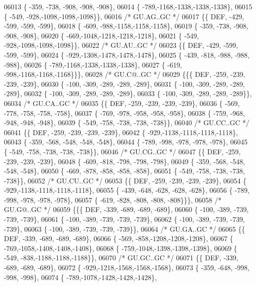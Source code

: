 \begin{DoxyCode}
06013 \{ -359, -738, -908, -908, -908\},
06014 \{ -789,-1168,-1338,-1338,-1338\},
06015 \{ -549, -928,-1098,-1098,-1098\}\},
06016 \textcolor{comment}{/* GU.AG..GC */}
06017 \{\{  DEF, -429, -599, -599, -599\},
06018 \{ -609, -988,-1158,-1158,-1158\},
06019 \{ -359, -738, -908, -908, -908\},
06020 \{ -669,-1048,-1218,-1218,-1218\},
06021 \{ -549, -928,-1098,-1098,-1098\}\},
06022 \textcolor{comment}{/* GU.AU..GC */}
06023 \{\{  DEF, -429, -599, -599, -599\},
06024 \{ -929,-1308,-1478,-1478,-1478\},
06025 \{ -439, -818, -988, -988, -988\},
06026 \{ -789,-1168,-1338,-1338,-1338\},
06027 \{ -619, -998,-1168,-1168,-1168\}\}\},
06028 \textcolor{comment}{/* GU.C@..GC */}
06029 \{\{\{  DEF, -259, -239, -239, -239\},
06030 \{ -100, -309, -289, -289, -289\},
06031 \{ -100, -309, -289, -289, -289\},
06032 \{ -100, -309, -289, -289, -289\},
06033 \{ -100, -309, -289, -289, -289\}\},
06034 \textcolor{comment}{/* GU.CA..GC */}
06035 \{\{  DEF, -259, -239, -239, -239\},
06036 \{ -569, -778, -758, -758, -758\},
06037 \{ -769, -978, -958, -958, -958\},
06038 \{ -759, -968, -948, -948, -948\},
06039 \{ -549, -758, -738, -738, -738\}\},
06040 \textcolor{comment}{/* GU.CC..GC */}
06041 \{\{  DEF, -259, -239, -239, -239\},
06042 \{ -929,-1138,-1118,-1118,-1118\},
06043 \{ -359, -568, -548, -548, -548\},
06044 \{ -789, -998, -978, -978, -978\},
06045 \{ -549, -758, -738, -738, -738\}\},
06046 \textcolor{comment}{/* GU.CG..GC */}
06047 \{\{  DEF, -259, -239, -239, -239\},
06048 \{ -609, -818, -798, -798, -798\},
06049 \{ -359, -568, -548, -548, -548\},
06050 \{ -669, -878, -858, -858, -858\},
06051 \{ -549, -758, -738, -738, -738\}\},
06052 \textcolor{comment}{/* GU.CU..GC */}
06053 \{\{  DEF, -259, -239, -239, -239\},
06054 \{ -929,-1138,-1118,-1118,-1118\},
06055 \{ -439, -648, -628, -628, -628\},
06056 \{ -789, -998, -978, -978, -978\},
06057 \{ -619, -828, -808, -808, -808\}\}\},
06058 \textcolor{comment}{/* GU.G@..GC */}
06059 \{\{\{  DEF, -339, -689, -689, -689\},
06060 \{ -100, -389, -739, -739, -739\},
06061 \{ -100, -389, -739, -739, -739\},
06062 \{ -100, -389, -739, -739, -739\},
06063 \{ -100, -389, -739, -739, -739\}\},
06064 \textcolor{comment}{/* GU.GA..GC */}
06065 \{\{  DEF, -339, -689, -689, -689\},
06066 \{ -569, -858,-1208,-1208,-1208\},
06067 \{ -769,-1058,-1408,-1408,-1408\},
06068 \{ -759,-1048,-1398,-1398,-1398\},
06069 \{ -549, -838,-1188,-1188,-1188\}\},
06070 \textcolor{comment}{/* GU.GC..GC */}
06071 \{\{  DEF, -339, -689, -689, -689\},
06072 \{ -929,-1218,-1568,-1568,-1568\},
06073 \{ -359, -648, -998, -998, -998\},
06074 \{ -789,-1078,-1428,-1428,-1428\},

\end{DoxyCode}
